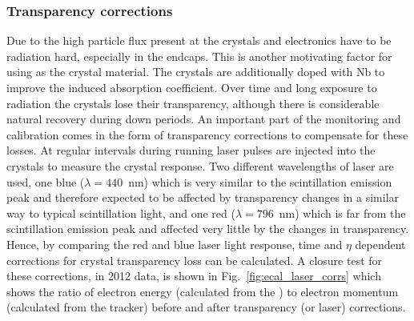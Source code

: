 \subsubsection{Transparency corrections}
Due to the high particle flux present at \CMS the \ECAL crystals and electronics have to be radiation hard, especially in the endcaps. This is another motivating factor for using \PbWO as the crystal material. The crystals are additionally doped with Nb to improve the induced absorption coefficient. Over time and long exposure to radiation the crystals lose their transparency, although there is considerable natural recovery during down periods. An important part of the \ECAL monitoring and calibration comes in the form of transparency corrections to compensate for these losses. At regular intervals during \LHC running laser pulses are injected into the crystals to measure the crystal response. Two different wavelengths of laser are used, one blue ($\lambda=440$~nm) which is very similar to the scintillation emission peak and therefore expected to be affected by transparency changes in a similar way to typical scintillation light, and one red ($\lambda=796$~nm) which is far from the scintillation emission peak and affected very little by the changes in transparency. Hence, by comparing the red and blue laser light response, time and $\eta$ dependent corrections for crystal transparency loss can be calculated. A closure test for these corrections, in 2012 data, is shown in Fig.~\ref{fig:ecal_laser_corrs} which shows the ratio of electron energy (calculated from the \ECAL) to electron momentum (calculated from the tracker) before and after transparency (or laser) corrections. 
